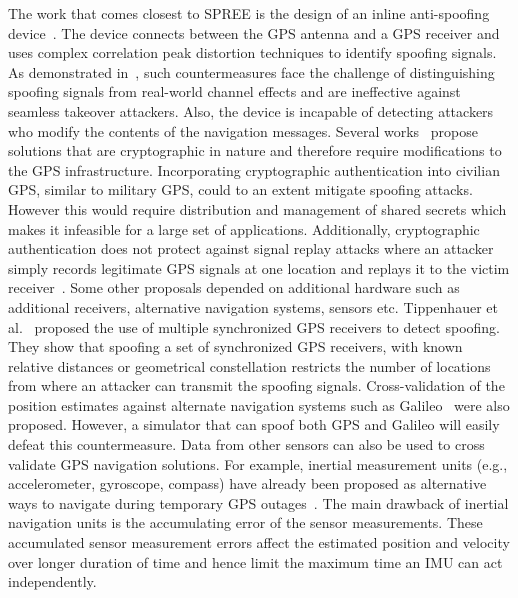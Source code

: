 \documentclass[letterpaper,twocolumn,10pt]{article}
\newcommand{\eg}{e.g.,\xspace}
\newcommand{\rxname}{SPREE\xspace}
\begin{document}
{The work that comes closest to \rxname is the design of an inline anti-spoofing device~\cite{ledvina2001line}. The device connects between the GPS antenna and a GPS receiver and uses complex correlation peak distortion techniques to identify spoofing signals. As demonstrated in~\cite{Wesson2011}, such countermeasures face the challenge of distinguishing spoofing signals from real-world channel effects and are ineffective against seamless takeover attackers. Also, the device is incapable of detecting attackers who modify the contents of the navigation messages. Several works~\cite{kuhn2005asymmetric,lo2010authenticating,wesson2012practical} propose solutions that are cryptographic in nature and therefore require modifications to the GPS infrastructure. Incorporating cryptographic authentication into civilian GPS, similar to military GPS, could to an extent mitigate spoofing attacks. However this would require distribution and management of shared secrets which makes it infeasible for a large set of applications. Additionally, cryptographic authentication does not protect against signal replay attacks where an attacker simply records legitimate GPS signals at one location and replays it to the victim receiver~\cite{Papadimitratos2008}. Some other proposals depended on additional hardware such as additional receivers, alternative navigation systems, sensors etc. Tippenhauer et al.~\cite{Tippenhauer2011} proposed the use of multiple synchronized GPS receivers to detect spoofing. They show that spoofing a set of synchronized GPS receivers, with known relative distances or geometrical constellation restricts the number of locations from
where an attacker can transmit the spoofing signals. Cross-validation of the position estimates against alternate navigation systems such as Galileo~\cite{hofmann2007gnss} were also proposed. However, a simulator that can spoof both GPS and Galileo will easily defeat this countermeasure. Data from other sensors can also be used to cross validate GPS navigation solutions. For example, inertial measurement units (\eg accelerometer,
gyroscope, compass) have already been proposed as alternative ways to navigate
during temporary GPS outages~\cite{titterton2004strapdown,farrell1999global,wendel2006integrated}.
The main drawback of inertial navigation units is the accumulating error of the
sensor measurements. These accumulated sensor measurement errors affect the
estimated position and velocity over longer duration of time and hence limit
the maximum time an IMU can act independently.







}
\end{document}
